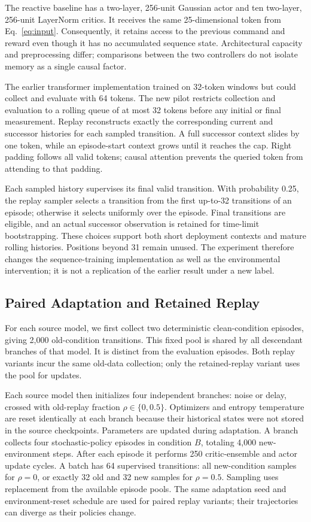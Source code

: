 \documentclass[runningheads]{llncs}
\begin{document}
The reactive baseline has a two-layer, 256-unit Gaussian actor and ten two-layer, 256-unit LayerNorm critics. It receives the same 25-dimensional token from Eq.~\ref{eq:input}. Consequently, it retains access to the previous command and reward even though it has no accumulated sequence state. Architectural capacity and preprocessing differ; comparisons between the two controllers do not isolate memory as a single causal factor.

The earlier transformer implementation trained on 32-token windows but could collect and evaluate with 64 tokens. The new pilot restricts collection and evaluation to a rolling queue of at most 32 tokens before any initial or final measurement. Replay reconstructs exactly the corresponding current and successor histories for each sampled transition. A full successor context slides by one token, while an episode-start context grows until it reaches the cap. Right padding follows all valid tokens; causal attention prevents the queried token from attending to that padding.

Each sampled history supervises its final valid transition. With probability 0.25, the replay sampler selects a transition from the first up-to-32 transitions of an episode; otherwise it selects uniformly over the episode. Final transitions are eligible, and an actual successor observation is retained for time-limit bootstrapping. These choices support both short deployment contexts and mature rolling histories. Positions beyond 31 remain unused. The experiment therefore changes the sequence-training implementation as well as the environmental intervention; it is not a replication of the earlier result under a new label.

\subsection{Paired Adaptation and Retained Replay}
For each source model, we first collect two deterministic clean-condition episodes, giving 2,000 old-condition transitions. This fixed pool is shared by all descendant branches of that model. It is distinct from the evaluation episodes. Both replay variants incur the same old-data collection; only the retained-replay variant uses the pool for updates.

Each source model then initializes four independent branches: noise or delay, crossed with old-replay fraction $\rho\in\{0,0.5\}$. Optimizers and entropy temperature are reset identically at each branch because their historical states were not stored in the source checkpoints. Parameters are updated during adaptation. A branch collects four stochastic-policy episodes in condition $B$, totaling 4,000 new-environment steps. After each episode it performs 250 critic-ensemble and actor update cycles. A batch has 64 supervised transitions: all new-condition samples for $\rho=0$, or exactly 32 old and 32 new samples for $\rho=0.5$. Sampling uses replacement from the available episode pools. The same adaptation seed and environment-reset schedule are used for paired replay variants; their trajectories can diverge as their policies change.
\end{document}
